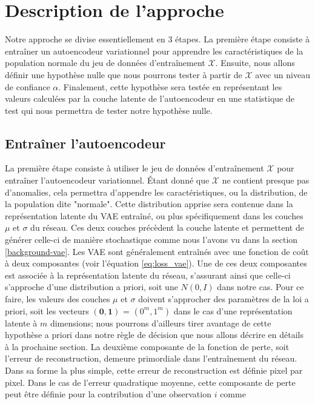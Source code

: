 \section{Description de l'approche}

Notre approche se divise essentiellement en 3 étapes. La première étape consiste à entraîner un autoencodeur variationnel pour apprendre les caractéristiques de la population normale du jeu de données d'entraînement $\mathcal{X}$. Ensuite, nous allons définir une hypothèse nulle que nous pourrons tester à partir de $\mathcal{X}$ avec un niveau de confiance $\alpha$. Finalement, cette hypothèse sera testée en représentant les valeurs calculées par la couche latente de l'autoencodeur en une statistique de test qui nous permettra de tester notre hypothèse nulle.

\subsection{Entraîner l'autoencodeur} \label{meth:train-vae}

La première étape consiste à utiliser le jeu de données d'entraînement $\mathcal{X}$ pour entraîner l'autoencodeur variationnel. Étant donné que $\mathcal{X}$ ne contient presque pas d'anomalies, cela permettra d'appendre les caractéristiques, ou la distribution, de la population dite "normale". Cette distribution apprise sera contenue dans la représentation latente du VAE entraîné, ou plus spécifiquement dans les couches $\mu$ et $\sigma$ du réseau. Ces deux couches précèdent la couche latente et permettent de générer celle-ci de manière stochastique comme nous l'avons vu dans la section \ref{background-vae}. Les VAE sont généralement entraînés avec une fonction de coût à deux composantes (voir l'équation \ref{eq:loss_vae}). Une de ces deux composantes est associée à la représentation latente du réseau, s'assurant ainsi que celle-ci s'approche d'une distribution a priori, soit une $N(0, I)$ dans notre cas. Pour ce faire, les valeurs des couches $\mu$ et $\sigma$ doivent s'approcher des paramètres de la loi a priori, soit les vecteurs $(\mathbf{0}, \mathbf{1})$ = $(0^m, 1^m)$ dans le cas d'une représentation latente à $m$ dimensions; nous pourrons d'ailleurs tirer avantage de cette hypothèse a priori dans notre règle de décision que nous allons décrire en détails à la prochaine section. La deuxième composante de la fonction de perte, soit l'erreur de reconstruction, demeure primordiale dans l'entraînement du réseau. Dans sa forme la plus simple, cette erreur de reconstruction est définie pixel par pixel. Dans le cas de l'erreur quadratique moyenne, cette composante de perte peut être définie pour la contribution d'une observation $i$ comme

